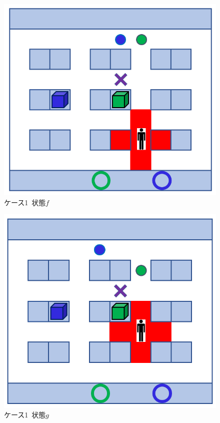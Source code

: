 \begin{figure}[!t]
    \centering
    \includegraphics[scale=0.3]{figures/HITL2_case1_f.png}
    \caption{ケース1\ 状態$f$}
    \label{fig:HITL2_case1_f}
\end{figure}

\begin{figure}[!t]
    \centering
    \includegraphics[scale=0.3]{figures/HITL2_case1_g.png}
    \caption{ケース1\ 状態$g$}
    \label{fig:HITL2_case1_g}
\end{figure}

